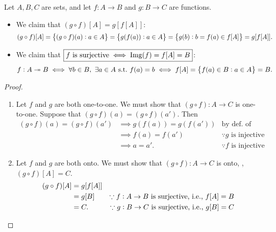 \documentclass[11pt,openany]{article}
\begin{document}
\newpage
\begin{note}
	Let $A,B,C$ are sets, and let $f:A\to B$ and $g:B\to C$ are functions.
	\begin{itemize}
		\item We claim that $\boxed{(g\circ f)[A]=g[f[A]]}$:\[
		(g\circ f)[A]=\set{(g\circ f)(a):a\in A}=\set{g(f(a)):a\in A}=\set{g(b):b=f(a)\in f[A]}=g[f[A]].
		\]
		\item We claim that $\boxed{f\ \text{is surjective}\iff \text{Img}(f)=f[A]=B}$: \[
			f:A\twoheadrightarrow B\iff \forall b\in B,\ \exists a\in A\ \text{s.t.}\ f(a)=b\iff f[A]=\set{f(a)\in B:a\in A}=B.
			\]
	\end{itemize} 
\end{note}
\begin{proof}
	\textcolor{gray!30!white}{\begin{enumerate}[(1)]
		\item Let $f$ and $g$ are both one-to-one. We must show that $(g\circ f):A\to C$ is one-to-one. Suppose that $(g\circ f)(a)=(g\circ f)(a')$. Then \begin{align*}
			(g\circ f)(a)=(g\circ f)(a') &\implies g(f(a))=g(f(a')) &\text{by def. of composition} \\&\implies f(a)=f(a') &\because\text{$g$ is injective} \\
			&\implies a=a'. &\because\text{$f$ is injective}
		\end{align*}
		\item Let $f$ and $g$ are both onto. We must show that $(g\circ f):A\to C$ is onto, \ie, $(g\circ f)[A]=C$.
		\begin{align*}
			(g\circ f)[A] &=g[f[A]] \\
			&= g[B] &\because\text{$f:A\to B$ is surjective, \textnormal{i.e.}, $f[A]=B$} \\
			&= C. &\because\text{$g:B\to C$ is surjective, \textnormal{i.e.}, $g[B]=C$} \\
		\end{align*}
	\end{enumerate}}
\end{proof}
\end{document}
